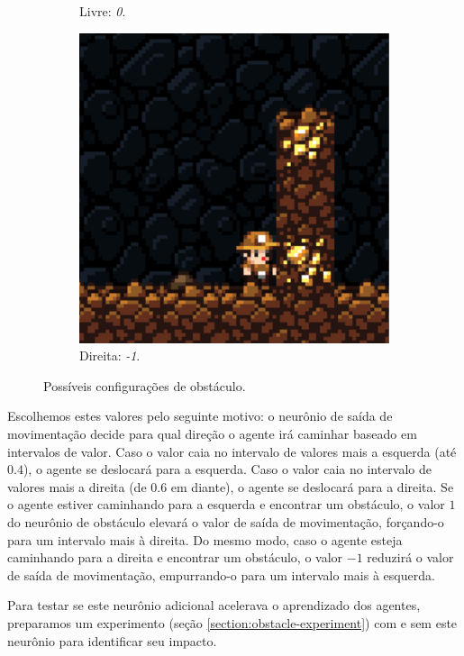 \begin{figure}[H]
\begin{subfigure}[b]{0.2\textwidth}
        \caption{Livre: \textit{0}.}
	\end{subfigure}
	\begin{subfigure}[b]{0.2\textwidth}
        \includegraphics[width=\textwidth]{fig/obstacle.pdf}
        \caption{Direita: \textit{-1}.}
	\end{subfigure}
    \caption{Possíveis configurações de obstáculo.}
	\label{fig:obstacle-input-correct}
\end{figure}

Escolhemos estes valores pelo seguinte motivo: o neurônio de saída de
movimentação decide para qual direção o agente irá caminhar baseado em
intervalos de valor. Caso o valor caia no intervalo de valores mais a esquerda
(até $0.4$), o agente se deslocará para a esquerda. Caso o valor caia no
intervalo de valores mais a direita (de $0.6$ em diante), o agente se deslocará
para a direita. Se o agente estiver caminhando para a esquerda e encontrar um
obstáculo, o valor $1$ do neurônio de obstáculo elevará o valor de saída de
movimentação, forçando-o para um intervalo mais à direita. Do mesmo modo, caso o
agente esteja caminhando para a direita e encontrar um obstáculo, o valor $-1$
reduzirá o valor de saída de movimentação, empurrando-o para um intervalo mais à
esquerda.

Para testar se este neurônio adicional acelerava o aprendizado dos agentes,
preparamos um experimento (seção \ref{section:obstacle-experiment}) com e sem
este neurônio para identificar seu impacto.

